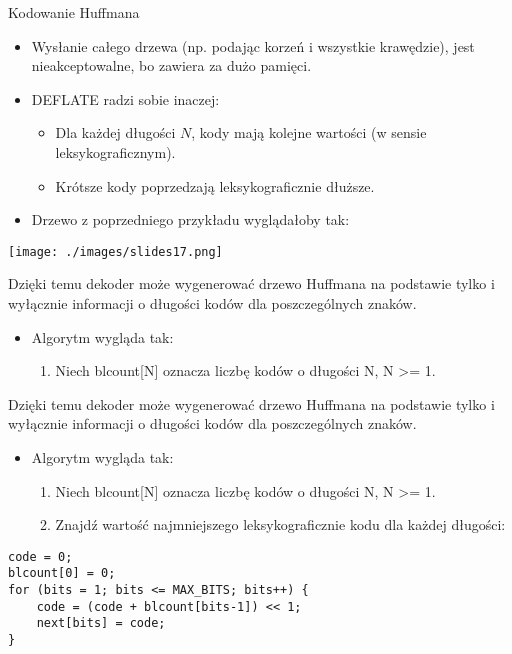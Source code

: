 \documentclass[presentation]{beamer}
\begin{document}
\begin{frame}[label={sec:org4184db9}]{Kodowanie Huffmana}
\begin{itemize}
\item Wysłanie całego drzewa (np. podając korzeń i wszystkie
krawędzie), jest nieakceptowalne, bo zawiera za dużo pamięci.
\item DEFLATE radzi sobie inaczej:
\begin{itemize}
\item Dla każdej długości \(N\), kody mają kolejne wartości (w sensie
leksykograficznym).
\item Krótsze kody poprzedzają leksykograficznie dłuższe.
\end{itemize}
\item Drzewo z poprzedniego przykładu wyglądałoby tak:
\end{itemize}

\begin{center}
\texttt{[image: ./images/slides17.png]}
\end{center}
\end{frame}

\begin{frame}[label={sec:orgdcc5bce}]{Dzięki temu dekoder może wygenerować drzewo Huffmana na podstawie tylko i wyłącznie informacji o długości kodów dla poszczególnych znaków.}
\begin{itemize}
\item Algorytm wygląda tak:
\begin{enumerate}
\item Niech blcount[N] oznacza liczbę kodów o długości N, N >= 1.
\end{enumerate}
\end{itemize}
\end{frame}

\begin{frame}[fragile,label={sec:org8fc05a3}]{Dzięki temu dekoder może wygenerować drzewo Huffmana na podstawie tylko i wyłącznie informacji o długości kodów dla poszczególnych znaków.}
 \begin{itemize}
\item Algorytm wygląda tak:
\begin{enumerate}
\item Niech blcount[N] oznacza liczbę kodów o długości N, N >= 1.
\item Znajdź wartość najmniejszego leksykograficznie kodu dla każdej długości:
\end{enumerate}
\end{itemize}
\begin{verbatim}
code = 0;
blcount[0] = 0;
for (bits = 1; bits <= MAX_BITS; bits++) {
    code = (code + blcount[bits-1]) << 1;
    next[bits] = code;
}
\end{verbatim}
\end{frame}
\end{document}
